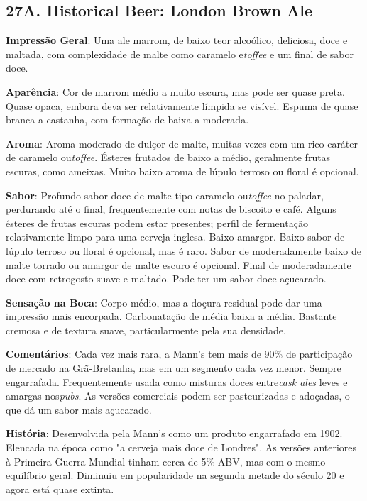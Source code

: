 \subsection*{27A. Historical Beer: London Brown Ale}
\textbf{Impressão Geral}: Uma ale marrom, de baixo teor alcoólico, deliciosa, doce e maltada, com complexidade de malte como caramelo e\textit{toffee} e um final de sabor doce.

\textbf{Aparência}: Cor de marrom médio a muito escura, mas pode ser quase preta. Quase opaca, embora deva ser relativamente límpida se visível. Espuma de quase branca a castanha, com formação de baixa a moderada.

\textbf{Aroma}: Aroma moderado de dulçor de malte, muitas vezes com um rico caráter de caramelo ou\textit{toffee}. Ésteres frutados de baixo a médio, geralmente frutas escuras, como ameixas. Muito baixo aroma de lúpulo terroso ou floral é opcional.

\textbf{Sabor}: Profundo sabor doce de malte tipo caramelo ou\textit{toffee} no paladar, perdurando até o final, frequentemente com notas de biscoito e café. Alguns ésteres de frutas escuras podem estar presentes; perfil de fermentação relativamente limpo para uma cerveja inglesa. Baixo amargor. Baixo sabor de lúpulo terroso ou floral é opcional, mas é raro. Sabor de moderadamente baixo de malte torrado ou amargor de malte escuro é opcional. Final de moderadamente doce com retrogosto suave e maltado. Pode ter um sabor doce açucarado.

\textbf{Sensação na Boca}: Corpo médio, mas a doçura residual pode dar uma impressão mais encorpada. Carbonatação de média baixa a média. Bastante cremosa e de textura suave, particularmente pela sua densidade.

\textbf{Comentários}: Cada vez mais rara, a Mann's tem mais de 90\% de participação de mercado na Grã-Bretanha, mas em um segmento cada vez menor. Sempre engarrafada. Frequentemente usada como misturas doces entre\textit{cask ales} leves e amargas nos\textit{pubs}. As versões comerciais podem ser pasteurizadas e adoçadas, o que dá um sabor mais açucarado.

\textbf{História}: Desenvolvida pela Mann's como um produto engarrafado em 1902. Elencada na época como "a cerveja mais doce de Londres". As versões anteriores à Primeira Guerra Mundial tinham cerca de 5\% ABV, mas com o mesmo equilíbrio geral. Diminuiu em popularidade na segunda metade do século 20 e agora está quase extinta.

